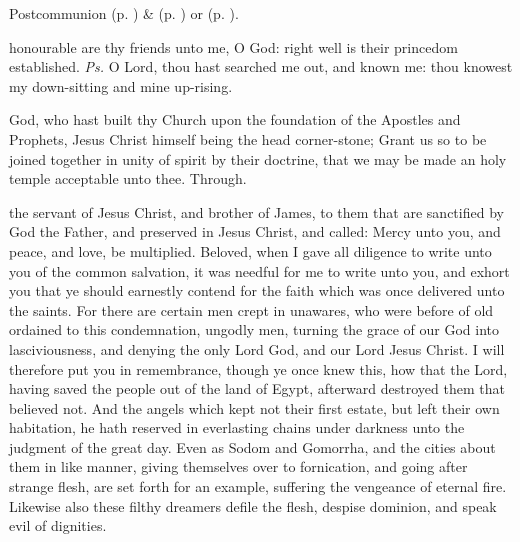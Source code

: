 \begin{rubric}
	 Postcommunion  (p. \pageref{SPMaryInEaster}) \&   (p. \pageref{SPAgainst}) or  (p. \pageref{SPChiefBishop}).
\end{rubric}



\introit
{} honourable are thy friends unto me, O God: right well is their princedom established. \textit{Ps.} O Lord, thou hast searched me out, and known me: thou knowest my down-sitting and mine up-rising.

\collect
{} God, who hast built thy Church upon the foundation of the Apostles and Prophets, Jesus Christ himself being the head corner-stone; Grant us so to be joined together in unity of spirit by their doctrine, that we may be made an holy temple acceptable unto thee. Through.

 the servant of Jesus Christ, and brother of James, to them that are sanctified by God the Father, and preserved in Jesus Christ, and called: Mercy unto you, and peace, and love, be multiplied. Beloved, when I gave all diligence to write unto you of the common salvation, it was needful for me to write unto you, and exhort you that ye should earnestly contend for the faith which was once delivered unto the saints. For there are certain men crept in unawares, who were before of old ordained to this condemnation, ungodly men, turning the grace of our God into lasciviousness, and denying the only Lord God, and our Lord Jesus Christ. I will therefore put you in remembrance, though ye once knew this, how that the Lord, having saved the people out of the land of Egypt, afterward destroyed them that believed not. And the angels which kept not their first estate, but left their own habitation, he hath reserved in everlasting chains under darkness unto the judgment of the great day. Even as Sodom and Gomorrha, and the cities about them in like manner, giving themselves over to fornication, and going after strange flesh, are set forth for an example, suffering the vengeance of eternal fire. Likewise also these filthy dreamers defile the flesh, despise dominion, and speak evil of dignities.


